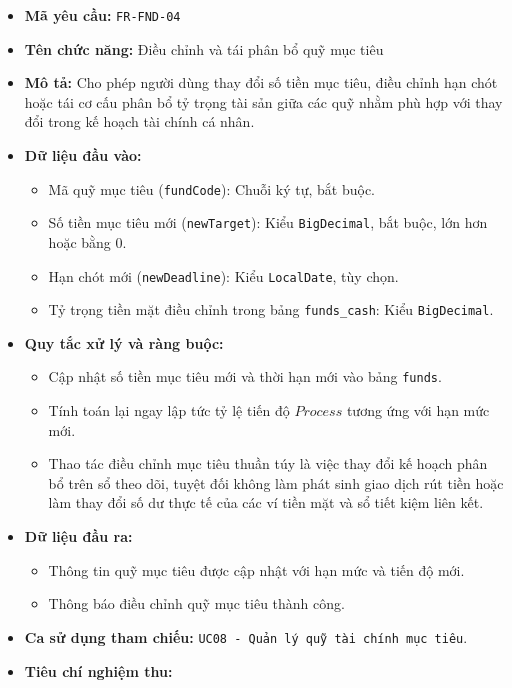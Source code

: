 \documentclass[11pt,a4paper]{article}
\providecommand{\tightlist}{
  \setlength{\itemsep}{0pt}\setlength{\parskip}{0pt}}
\begin{document}
\begin{itemize}
\tightlist
\item
  \textbf{Mã yêu cầu:} \texttt{FR-FND-04}
\item
  \textbf{Tên chức năng:} Điều chỉnh và tái phân bổ quỹ mục tiêu
\item
  \textbf{Mô tả:} Cho phép người dùng thay đổi số tiền mục tiêu, điều
  chỉnh hạn chót hoặc tái cơ cấu phân bổ tỷ trọng tài sản giữa các quỹ
  nhằm phù hợp với thay đổi trong kế hoạch tài chính cá nhân.
\item
  \textbf{Dữ liệu đầu vào:}

  \begin{itemize}
  \tightlist
  \item
    Mã quỹ mục tiêu (\texttt{fundCode}): Chuỗi ký tự, bắt buộc.
  \item
    Số tiền mục tiêu mới (\texttt{newTarget}): Kiểu \texttt{BigDecimal},
    bắt buộc, lớn hơn hoặc bằng 0.
  \item
    Hạn chót mới (\texttt{newDeadline}): Kiểu \texttt{LocalDate}, tùy
    chọn.
  \item
    Tỷ trọng tiền mặt điều chỉnh trong bảng \texttt{funds\_cash}: Kiểu
    \texttt{BigDecimal}.
  \end{itemize}
\item
  \textbf{Quy tắc xử lý và ràng buộc:}

  \begin{itemize}
  \tightlist
  \item
    Cập nhật số tiền mục tiêu mới và thời hạn mới vào bảng
    \texttt{funds}.
  \item
    Tính toán lại ngay lập tức tỷ lệ tiến độ \(Process\) tương ứng với
    hạn mức mới.
  \item
    Thao tác điều chỉnh mục tiêu thuần túy là việc thay đổi kế hoạch
    phân bổ trên sổ theo dõi, tuyệt đối không làm phát sinh giao dịch
    rút tiền hoặc làm thay đổi số dư thực tế của các ví tiền mặt và sổ
    tiết kiệm liên kết.
  \end{itemize}
\item
  \textbf{Dữ liệu đầu ra:}

  \begin{itemize}
  \tightlist
  \item
    Thông tin quỹ mục tiêu được cập nhật với hạn mức và tiến độ mới.
  \item
    Thông báo điều chỉnh quỹ mục tiêu thành công.
  \end{itemize}
\item
  \textbf{Ca sử dụng tham chiếu:}
  \texttt{UC08\ -\ Quản\ lý\ quỹ\ tài\ chính\ mục\ tiêu}.
\item
  \textbf{Tiêu chí nghiệm thu:}


\end{itemize}
\end{document}
